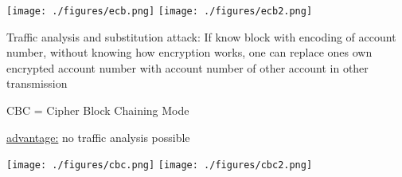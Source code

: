 \documentclass[landscape, a4paper]{article}
\begin{document}
\begin{minipage}[t]{0.198\pagewidth}
\begin{betterlist}
\begin{betterlist}
\begin{betterlist}
			\end{betterlist}
			\texttt{[image: ./figures/ecb.png]}
			\texttt{[image: ./figures/ecb2.png]}
			\begin{betterlist}
				\item \alert{Traffic analysis and substitution attack:} If know block with encoding of account number, without knowing how encryption works, one can replace ones own encrypted account number with account number of other account in other transmission
			\end{betterlist}
			\item \alert{CBC} = Cipher Block Chaining Mode
			\begin{betterlist}
				\item \underline{advantage:} no \alert{traffic analysis} possible
			\end{betterlist}

			\texttt{[image: ./figures/cbc.png]}
			\texttt{[image: ./figures/cbc2.png]}
		\end{betterlist}
	\end{betterlist}
\end{minipage}
\end{document}
